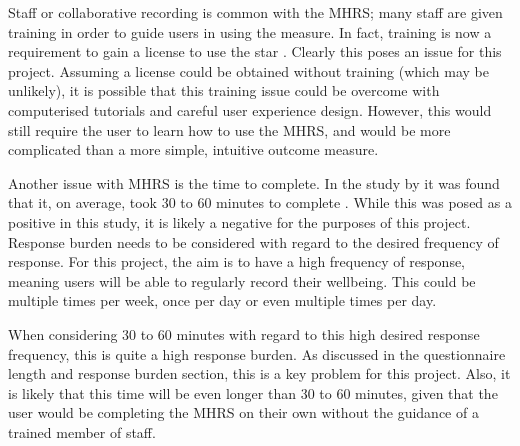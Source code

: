 \documentclass[11pt,openright,a4paper]{report}
\begin{document}
Staff or collaborative recording is common with the MHRS; many staff are given training in order to guide users in using the measure. In fact, training is now a requirement to gain a license to use the star \parencite{starlicense}. Clearly this poses an issue for this project. Assuming a license could be obtained without training (which may be unlikely), it is possible that this training issue could be overcome with computerised tutorials and careful user experience design. However, this would still require the user to learn how to use the MHRS, and would be more complicated than a more simple, intuitive outcome measure.

Another issue with MHRS is the time to complete. In the study by \citeauthor{killaspy2012psychometric} it was found that it, on average, took 30 to 60 minutes to complete \parencite{killaspy2012psychometric}. While this was posed as a positive in this study, it is likely a negative for the purposes of this project. Response burden needs to be considered with regard to the desired frequency of response. For this project, the aim is to have a high frequency of response, meaning users will be able to regularly record their wellbeing. This could be multiple times per week, once per day or even multiple times per day. 

When considering 30 to 60 minutes with regard to this high desired response frequency, this is quite a high response burden. As discussed in the questionnaire length and response burden section, this is a key problem for this project. Also, it is likely that this time will be even longer than 30 to 60 minutes, given that the user would be completing the MHRS on their own without the guidance of a trained member of staff.
\end{document}
